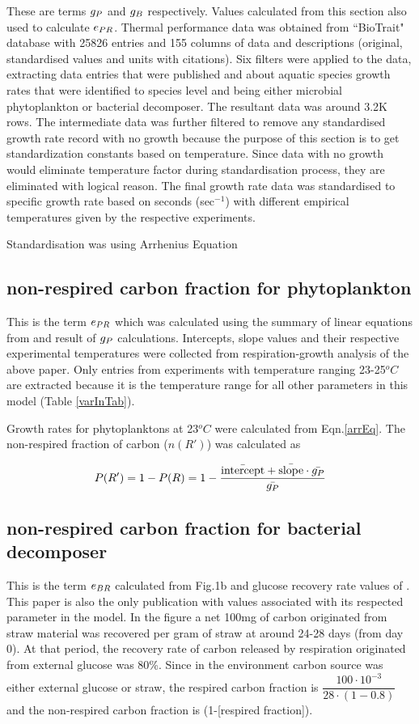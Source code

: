 \documentclass[../thesis.tex]{subfiles} %
\begin{document}
These are terms $g_P$ and $g_B$ respectively.  Values calculated from this section also used to calculate $e_{PR}$.  Thermal performance data was obtained from ``BioTrait" database\autocite{della2013thermal} with 25826 entries and 155 columns of data and descriptions (original, standardised values and units with citations).  Six filters were applied to the data, extracting data entries that were published and about aquatic species growth rates that were identified to species level and being either microbial phytoplankton or bacterial decomposer.  The resultant data was around 3.2K rows.  The intermediate data was further filtered to remove any standardised growth rate record with no growth because the purpose of this section is to get standardization constants based on temperature.  Since data with no growth would eliminate temperature factor during standardisation process, they are eliminated with logical reason.  The final growth rate data was standardised to specific growth rate based on seconds (sec$^{-1}$) with different empirical temperatures given by the respective experiments.

Standardisation was using Arrhenius Equation

\subsection{non-respired carbon fraction for phytoplankton}
This is the term $e_{PR}$ which was calculated using the summary of linear equations from \autocite{j1989respiration} and result of $g_P$ calculations.  Intercepts, slope values and their respective experimental temperatures were collected from respiration-growth analysis of the above paper.  Only entries from experiments with temperature ranging 23-25$^oC$ are extracted because it is the temperature range for all other parameters in this model (Table \ref{varInTab}).

Growth rates for phytoplanktons at 23$^oC$ were calculated from Eqn.\ref{arrEq}.  The non-respired fraction of carbon ($n(R')$) was calculated as

\begin{equation}
    P(R') = 1-P(R) = 1-\dfrac{\Bar{\text{intercept}}+\Bar{\text{slope}}\cdot\Bar{g_P}}{\Bar{g_P}}
    \label{ePReqn}
\end{equation}

\subsection{non-respired carbon fraction for bacterial decomposer}
This is the term $e_{BR}$ calculated from Fig.1b and glucose recovery rate values of \autocite{cochran1988estimation}.  This paper is also the only publication with values associated with its respected parameter in the model.  In the figure a net 100mg of carbon originated from straw material was recovered per gram of straw at around 24-28 days (from day 0).  At that period, the recovery rate of carbon released by respiration originated from external glucose was 80\%.  Since in the environment carbon source was either external glucose or straw, the respired carbon fraction is $\dfrac{100\cdot10^{-3}}{28\cdot(1-0.8)}$ and the non-respired carbon fraction is (1-[respired fraction]).
\end{document}
